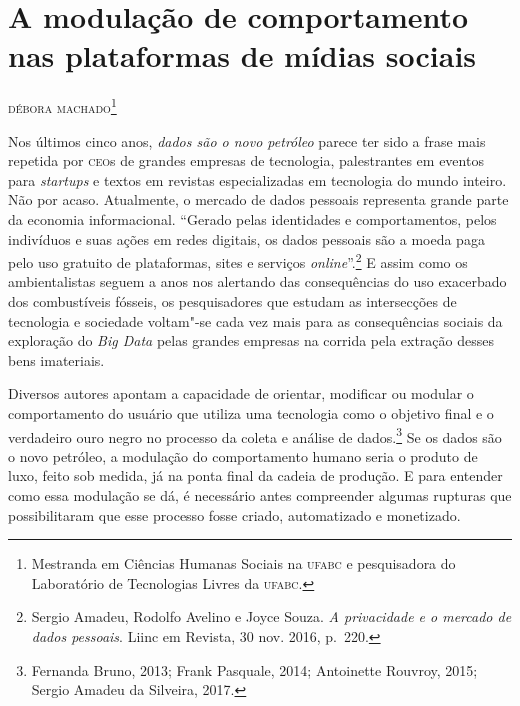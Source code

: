 \chapter[A modulação de comportamento nas plataformas de mídias sociais]{A modulação de comportamento\\ nas plataformas de mídias sociais}

\begin{flushright}
\textsc{débora machado\footnote{Mestranda em Ciências Humanas Sociais na \textsc{ufabc} e pesquisadora do Laboratório de Tecnologias Livres da \textsc{ufabc}.}}
\end{flushright}

\noindent{}Nos últimos cinco anos, \textit{dados são o novo petróleo} parece ter sido a
frase mais repetida por \textsc{ceo}s de grandes empresas de tecnologia,
palestrantes em eventos para \emph{startups} e textos em revistas
especializadas em tecnologia do mundo inteiro. Não por acaso.
Atualmente, o mercado de dados pessoais representa grande parte da
economia informacional. ``Gerado pelas identidades e comportamentos,
pelos indivíduos e suas ações em redes digitais, os dados pessoais são a
moeda paga pelo uso gratuito de plataformas, sites e serviços \emph{online}''.\footnote{Sergio Amadeu, Rodolfo Avelino e Joyce Souza. \emph{A privacidade e o
mercado de dados pessoais}. Liinc em Revista, 30 nov. 2016, p.\, 220.}
E assim como os ambientalistas
seguem a anos nos alertando das consequências do uso exacerbado dos
combustíveis fósseis, os pesquisadores que estudam as intersecções de
tecnologia e sociedade voltam"-se cada vez mais para as consequências
sociais da exploração do \emph{Big Data} pelas grandes empresas na corrida pela
extração desses bens imateriais.

Diversos autores apontam a capacidade de orientar, modificar ou modular
o comportamento do usuário que utiliza uma tecnologia como o objetivo
final e o verdadeiro ouro negro no processo da coleta e análise de dados.\footnote{Fernanda Bruno, 2013; Frank Pasquale, 2014; Antoinette Rouvroy, 2015; Sergio Amadeu da Silveira, 2017.} Se os dados são o novo petróleo, a modulação do comportamento humano seria o
produto de luxo, feito sob medida, já na ponta final da cadeia de
produção. E para entender como essa modulação se dá, é necessário antes
compreender algumas rupturas que possibilitaram que esse processo fosse
criado, automatizado e monetizado.

